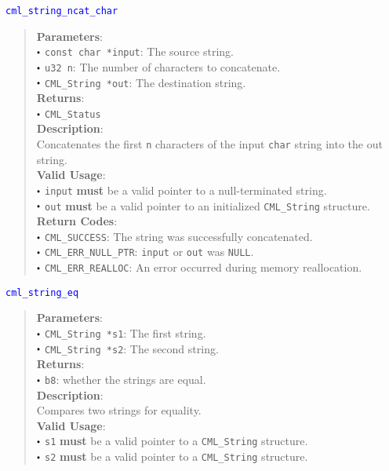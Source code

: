 \documentclass[a4paper,oneside,10pt]{article}
\newcommand{\function}[1]{
  \noindent\textcolor{blue}{\texttt{#1}}
  \vspace{-0.3em}
}
\renewcommand{\dot}{\raisebox{0.3ex}{\scalebox{0.6}{$\bullet$}}}
\theoremstyle{definition}
\begin{document}
\function{cml\_string\_ncat\_char}
\begin{quote}
  \textbf{Parameters}: \\
  $\dot$ \texttt{const char *input}: The source string. \\
  $\dot$ \texttt{u32 n}: The number of characters to concatenate. \\
  $\dot$ \texttt{CML\_String *out}: The destination string. \\
  \textbf{Returns}: \\
  $\dot$ \texttt{CML\_Status} \\

  \vspace{-0.75em}
  \textbf{Description}: \\
  Concatenates the first \texttt{n} characters of the input \texttt{char} string into the out string. \\

  \vspace{-0.75em}
  \textbf{Valid Usage}: \\
  $\dot$ \texttt{input} \textbf{must} be a valid pointer to a null-terminated string. \\
  $\dot$ \texttt{out} \textbf{must} be a valid pointer to an initialized \texttt{CML\_String} structure. \\

  \vspace{-0.75em}
  \textbf{Return Codes}: \\
  $\dot$ \texttt{CML\_SUCCESS}: The string was successfully concatenated. \\
  $\dot$ \texttt{CML\_ERR\_NULL\_PTR}: \texttt{input} or \texttt{out} was \texttt{NULL}. \\
  $\dot$ \texttt{CML\_ERR\_REALLOC}: An error occurred during memory reallocation. \\
\end{quote}

\function{cml\_string\_eq}
\begin{quote}
  \textbf{Parameters}: \\
  $\dot$ \texttt{CML\_String *s1}: The first string. \\
  $\dot$ \texttt{CML\_String *s2}: The second string. \\
  \textbf{Returns}: \\
  $\dot$ \texttt{b8}: whether the strings are equal. \\

  \vspace{-0.75em}
  \textbf{Description}: \\
  Compares two strings for equality. \\

  \vspace{-0.75em}
  \textbf{Valid Usage}: \\
  $\dot$ \texttt{s1} \textbf{must} be a valid pointer to a \texttt{CML\_String} structure. \\
  $\dot$ \texttt{s2} \textbf{must} be a valid pointer to a \texttt{CML\_String} structure. \\
\end{quote}
\end{document}
